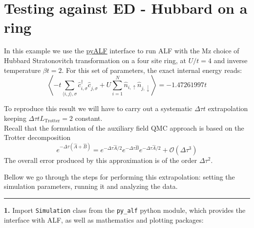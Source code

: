     
    

    
    \hypertarget{testing-against-ed---hubbard-on-a-ring}{%
\section{Testing against ED - Hubbard on a
ring}\label{testing-against-ed---hubbard-on-a-ring}}

    In this example we use the
\href{https://git.physik.uni-wuerzburg.de/ALF/pyALF/-/tree/master/}{pyALF}
interface to run ALF with the Mz choice of Hubbard Stratonovitch
transformation on a four site ring, at \(U/t=4\) and inverse temperature
\(\beta t = 2\). For this set of parameters, the exact internal energy
reads:\\
\[
 \left\langle -t \sum_{\langle i,j\rangle, \sigma} \hat{c}_{i,\sigma}^{\dagger} \hat{c}_{j,\sigma}^{\phantom\dagger}   +  U  \sum_{i=1}^{N} \hat{n}_{i,\uparrow}\hat{n}_{j,\downarrow}  \right\rangle  =   -1.47261997 t 
\]

To reproduce this result we will have to carry out a systematic
\(\Delta \tau t\) extrapolation keeping
\(\Delta \tau t L_\text{Trotter} = 2\) constant.\\
Recall that the formulation of the auxiliary field QMC approach is based
on the Trotter decomposition \[
e^{ -\Delta \tau \left( \hat{A} + \hat{B} \right) }  =  e^{ -\Delta \tau \hat{A}/2}  e^{ -\Delta \tau  \hat{B}  }   e^{ -\Delta \tau \hat{A}/2}  +  \mathcal{O} \left (\Delta  \tau^3\right)
\] The overall error produced by this approximation is of the order
\(\Delta \tau^2\).

Bellow we go through the steps for performing this extrapolation:
setting the simulation parameters, running it and analyzing the data.

\begin{center}\rule{0.5\linewidth}{0.5pt}\end{center}

\textbf{1.} Import \texttt{Simulation} class from the \texttt{py\_alf}
python module, which provides the interface with ALF, as well as
mathematics and plotting packages:

